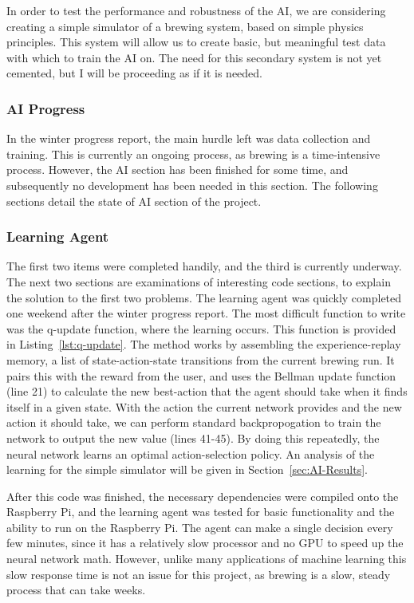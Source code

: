 \documentclass[draftclsnofoot,onecolumn,letterpaper,10pt]{IEEEtran}
\begin{document}
In order to test the performance and robustness of the AI, we are considering creating a simple simulator of a brewing system, based on simple physics principles.
This system will allow us to create basic, but meaningful test data with which to train the AI on.
The need for this secondary system is not yet cemented, but I will be proceeding as if it is needed.

\subsubsection{AI Progress}
In the winter progress report, the main hurdle left was data collection and training. This is currently an ongoing process, as brewing is a time-intensive process. However, the AI section has been finished for some time, and subsequently no development has been needed in this section. The following sections detail the state of AI section of the project.

\subsubsection{Learning Agent}
The first two items were completed handily, and the third is currently underway. The next two sections are examinations of interesting code sections, to explain the solution to the first two problems.
The learning agent was quickly completed one weekend after the winter progress report. The most difficult function to write was the q-update function, where the learning occurs. This function is provided in Listing~\ref{lst:q-update}.
\label{lst:q-update}
The method works by assembling the experience-replay memory, a list of state-action-state transitions from the current brewing run. It pairs this with the reward from the user, and uses the Bellman update function (line 21) to calculate the new best-action that the agent should take when it finds itself in a given state. With the action the current network provides and the new action it should take, we can perform standard backpropogation to train the network to output the new value (lines 41-45). By doing this repeatedly, the neural network learns an optimal action-selection policy. An analysis of the learning for the simple simulator will be given in Section~\ref{sec:AI-Results}.

After this code was finished, the necessary dependencies were compiled onto the Raspberry Pi, and the learning agent was tested for basic functionality and the ability to run on the Raspberry Pi. The agent can make a single decision every few minutes, since it has a relatively slow processor and no GPU to speed up the neural network math. However, unlike many applications of machine learning this slow response time is not an issue for this project, as brewing is a slow, steady process that can take weeks.
\end{document}
